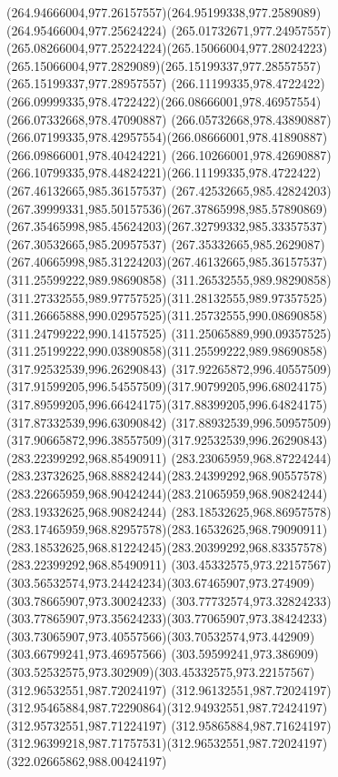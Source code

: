 {{	\curveto(264.94666004,977.26157557)(264.95199338,977.2589089)(264.95466004,977.25624224)
	\curveto(265.01732671,977.24957557)(265.08266004,977.25224224)(265.15066004,977.28024223)
	\curveto(265.15066004,977.2829089)(265.15199337,977.28557557)(265.15199337,977.28957557)
	\moveto(266.11199335,978.4722422)
	\curveto(266.09999335,978.4722422)(266.08666001,978.46957554)(266.07332668,978.47090887)
	\lineto(266.05732668,978.43890887)
	\curveto(266.07199335,978.42957554)(266.08666001,978.41890887)(266.09866001,978.40424221)
	\curveto(266.10266001,978.42690887)(266.10799335,978.44824221)(266.11199335,978.4722422)
	\moveto(267.46132665,985.36157537)
	\curveto(267.42532665,985.42824203)(267.39999331,985.50157536)(267.37865998,985.57890869)
	\curveto(267.35465998,985.45624203)(267.32799332,985.33357537)(267.30532665,985.20957537)
	\curveto(267.35332665,985.2629087)(267.40665998,985.31224203)(267.46132665,985.36157537)
	\moveto(311.25599222,989.98690858)
	\curveto(311.26532555,989.98290858)(311.27332555,989.97757525)(311.28132555,989.97357525)
	\curveto(311.26665888,990.02957525)(311.25732555,990.08690858)(311.24799222,990.14157525)
	\curveto(311.25065889,990.09357525)(311.25199222,990.03890858)(311.25599222,989.98690858)
	\moveto(317.92532539,996.26290843)
	\curveto(317.92265872,996.40557509)(317.91599205,996.54557509)(317.90799205,996.68024175)
	\curveto(317.89599205,996.66424175)(317.88399205,996.64824175)(317.87332539,996.63090842)
	\curveto(317.88932539,996.50957509)(317.90665872,996.38557509)(317.92532539,996.26290843)
	\moveto(283.22399292,968.85490911)
	\curveto(283.23065959,968.87224244)(283.23732625,968.88824244)(283.24399292,968.90557578)
	\curveto(283.22665959,968.90424244)(283.21065959,968.90824244)(283.19332625,968.90824244)
	\curveto(283.18532625,968.86957578)(283.17465959,968.82957578)(283.16532625,968.79090911)
	\curveto(283.18532625,968.81224245)(283.20399292,968.83357578)(283.22399292,968.85490911)
	\moveto(303.45332575,973.22157567)
	\curveto(303.56532574,973.24424234)(303.67465907,973.274909)(303.78665907,973.30024233)
	\curveto(303.77732574,973.32824233)(303.77865907,973.35624233)(303.77065907,973.38424233)
	\curveto(303.73065907,973.40557566)(303.70532574,973.442909)(303.66799241,973.46957566)
	\curveto(303.59599241,973.386909)(303.52532575,973.302909)(303.45332575,973.22157567)
	\moveto(312.96532551,987.72024197)
	\curveto(312.96132551,987.72024197)(312.95465884,987.72290864)(312.94932551,987.72424197)
	\lineto(312.95732551,987.71224197)
	\curveto(312.95865884,987.71624197)(312.96399218,987.71757531)(312.96532551,987.72024197)
	\moveto(322.02665862,988.00424197)
}}
